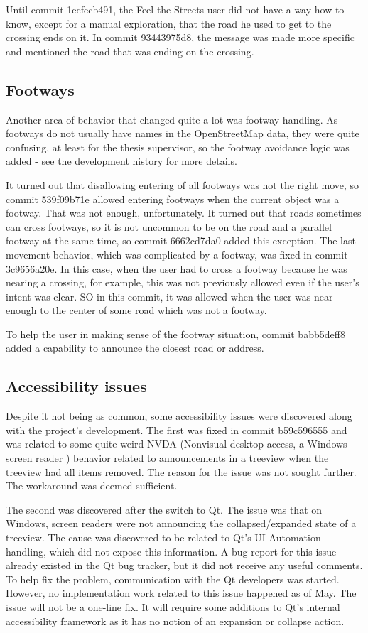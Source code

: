 \documentclass[nolof,digital]{fithesis3}
\begin{document}
Until commit 1ecfecb491, the Feel the Streets user did not have a way how to know, except for a manual exploration, that the road he used to get to the crossing ends on it. In commit 93443975d8, the message was made more specific and mentioned the road that was ending on the crossing.
\subsection{Footways} \label{ref:footways}
Another area of behavior that changed quite a lot was footway handling. As footways do not usually have names in the OpenStreetMap data, they were quite confusing, at least for the thesis supervisor, so the footway avoidance logic was added - see the development history for more details.

It turned out that disallowing entering of all footways was not the right move, so commit 539f09b71e allowed entering footways when the current object was a footway. That was not enough, unfortunately. It turned out that roads sometimes can cross footways, so it is not uncommon to be on the road and a parallel footway at the same time, so commit 6662cd7da0 added this exception. The last movement behavior, which was complicated by a footway, was fixed in commit 3c9656a20e. In this case, when the user had to cross a footway because he was nearing a crossing, for example, this was not previously allowed even if the user's intent was clear. SO in this commit, it was allowed when the user was near enough to the center of some road which was not a footway.

To help the user in making sense of the footway situation, commit babb5deff8 added a capability to announce the closest road or address.
\subsection{Accessibility issues} \label{ref:accessibility}
Despite it not being as common, some accessibility issues were discovered along with the project's development. The first was fixed in commit b59c596555 and was related to some quite weird NVDA (Nonvisual desktop access, a Windows screen reader \parencite{nvda}) behavior related to announcements in a treeview when the treeview had all items removed. The reason for the issue was not sought further. The workaround was deemed sufficient.

The second was discovered after the switch to Qt. The issue was that on Windows, screen readers were not announcing the collapsed/expanded state of a treeview. The cause was discovered to be related to Qt's UI Automation handling, which did not expose this information. A bug report for this issue already existed in the Qt bug tracker, but it did not receive any useful comments. To help fix the problem, communication with the Qt developers was started. However, no implementation work related to this issue happened as of May. The issue will not be a one-line fix. It will require some additions to Qt's internal accessibility framework as it has no notion of an expansion or collapse action.
\end{document}
